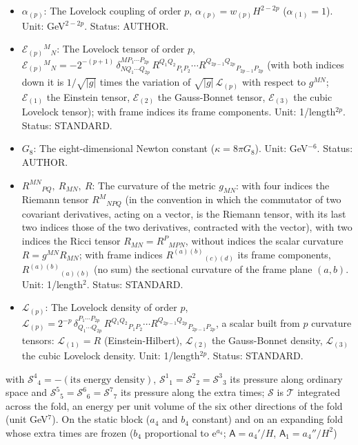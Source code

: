 \documentclass[
  10pt,
]{article}
\begin{document}
\begin{itemize}
  second label of a Kohn-Sham orbital, with the Kronecker delta of the
  two labels. Status: STANDARD.
\item
  \(\alpha_{(p)}\): The Lovelock coupling of order \(p\),
  \(\alpha_{(p)} = w_{(p)}H^{2-2p}\) (\(\alpha_{(1)} = 1\)). Unit:
  GeV\(^{2-2p}\). Status: AUTHOR.
\item
  \(\mathcal{E}_{(p)}{}^M{}_N\): The Lovelock tensor of order \(p\),
  \(\mathcal{E}_{(p)}{}^M{}_N = -2^{-(p+1)}\,\delta^{MP_1\cdots P_{2p}}_{NQ_1\cdots Q_{2p}}\,R^{Q_1Q_2}{}_{P_1P_2}\cdots R^{Q_{2p-1}Q_{2p}}{}_{P_{2p-1}P_{2p}}\)
  (with both indices down it is \(1/\sqrt{\lvert g\rvert}\) times the
  variation of \(\sqrt{\lvert g\rvert}\,\mathcal{L}_{(p)}\) with respect
  to \(g^{MN}\); \(\mathcal{E}_{(1)}\) the Einstein tensor,
  \(\mathcal{E}_{(2)}\) the Gauss-Bonnet tensor, \(\mathcal{E}_{(3)}\)
  the cubic Lovelock tensor); with frame indices its frame components.
  Unit: 1/length\(^{2p}\). Status: STANDARD.
\item
  \(G_8\): The eight-dimensional Newton constant
  (\(\kappa = 8\pi G_8\)). Unit: GeV\(^{-6}\). Status: AUTHOR.
\item
  \(R^{MN}{}_{PQ},\ R_{MN},\ R\): The curvature of the metric
  \(g_{MN}\): with four indices the Riemann tensor \(R^M{}_{NPQ}\) (in
  the convention in which the commutator of two covariant derivatives,
  acting on a vector, is the Riemann tensor, with its last two indices
  those of the two derivatives, contracted with the vector), with two
  indices the Ricci tensor \(R_{MN} = R^P{}_{MPN}\), without indices the
  scalar curvature \(R = g^{MN}R_{MN}\); with frame indices
  \(R^{(a)(b)}{}_{(c)(d)}\) its frame components,
  \(R^{(a)(b)}{}_{(a)(b)}\) (no sum) the sectional curvature of the
  frame plane \((a, b)\). Unit: 1/length\(^2\). Status: STANDARD.
\item
  \(\mathcal{L}_{(p)}\): The Lovelock density of order \(p\),
  \(\mathcal{L}_{(p)} = 2^{-p}\,\delta^{P_1\cdots P_{2p}}_{Q_1\cdots Q_{2p}}\,R^{Q_1Q_2}{}_{P_1P_2}\cdots R^{Q_{2p-1}Q_{2p}}{}_{P_{2p-1}P_{2p}}\),
  a scalar built from \(p\) curvature tensors: \(\mathcal{L}_{(1)} = R\)
  (Einstein-Hilbert), \(\mathcal{L}_{(2)}\) the Gauss-Bonnet density,
  \(\mathcal{L}_{(3)}\) the cubic Lovelock density. Unit:
  1/length\(^{2p}\). Status: STANDARD.
\end{itemize}

with \(\mathcal{S}^4{}_4 = -(\text{its energy density})\),
\(\mathcal{S}^1{}_1 = \mathcal{S}^2{}_2 = \mathcal{S}^3{}_3\) its
pressure along ordinary space and
\(\mathcal{S}^5{}_5 = \mathcal{S}^6{}_6 = \mathcal{S}^7{}_7\) its
pressure along the extra times; \(\mathcal{S}\) is \(\mathcal{T}\)
integrated across the fold, an energy per unit volume of the six other
directions of the fold (unit GeV\(^7\)). On the static block (\(a_4\)
and \(b_4\) constant) and on an expanding fold whose extra times are
frozen (\(b_4\) proportional to \(\mathrm{e}^{a_4}\);
\(\mathsf{A} = a_4'/H\), \(\mathsf{A}_1 = a_4''/H^2\))
\end{document}
